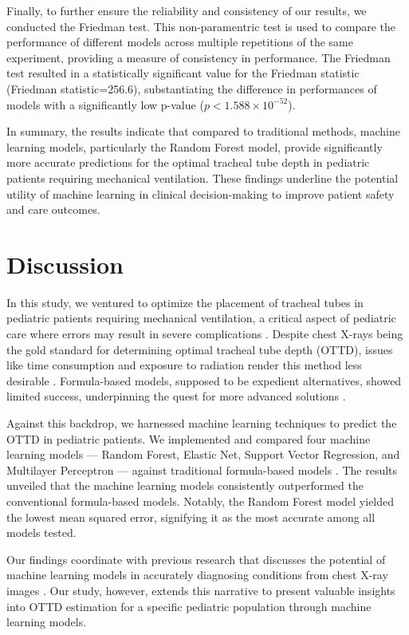 \documentclass[11pt]{article}
\begin{document}
Finally, to further ensure the reliability and consistency of our results, we conducted the Friedman test. This non-paramentric test is used to compare the performance of different models across multiple repetitions of the same experiment, providing a measure of consistency in performance. The Friedman test resulted in a statistically significant value for the Friedman statistic (Friedman statistic=256.6), substantiating the difference in performances of models with a significantly low p-value ($p<1.588 \times 10^{-52}$).

In summary, the results indicate that compared to traditional methods, machine learning models, particularly the Random Forest model, provide significantly more accurate predictions for the optimal tracheal tube depth in pediatric patients requiring mechanical ventilation. These findings underline the potential utility of machine learning in clinical decision-making to improve patient safety and care outcomes.

\section*{Discussion}

In this study, we ventured to optimize the placement of tracheal tubes in pediatric patients requiring mechanical ventilation, a critical aspect of pediatric care where errors may result in severe complications \cite{Baumeister1997EvaluationOP}. Despite chest X-rays being the gold standard for determining optimal tracheal tube depth (OTTD), issues like time consumption and exposure to radiation render this method less desirable \cite{Tareerath2021AccuracyOA}. Formula-based models, supposed to be expedient alternatives, showed limited success, underpinning the quest for more advanced solutions \cite{Takita2003TheHF}. 

Against this backdrop, we harnessed machine learning techniques to predict the OTTD in pediatric patients. We implemented and compared four machine learning models — Random Forest, Elastic Net, Support Vector Regression, and Multilayer Perceptron — against traditional formula-based models \cite{Driver2018EffectOU}. The results unveiled that the machine learning models consistently outperformed the conventional formula-based models. Notably, the Random Forest model yielded the lowest mean squared error, signifying it as the most accurate among all models tested.

Our findings coordinate with previous research that discusses the potential of machine learning models in accurately diagnosing conditions from chest X-ray images \cite{Chen2018DeterminingCT, Kumar2020AccuratePO}. Our study, however, extends this narrative to present valuable insights into OTTD estimation for a specific pediatric population through machine learning models. 
\end{document}
